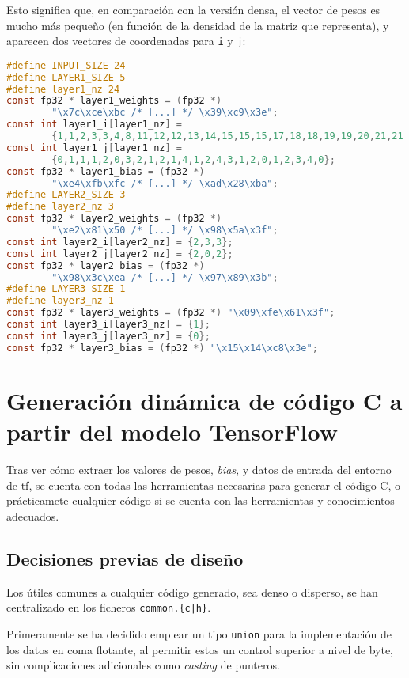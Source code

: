 Esto significa que, en comparación con la versión densa, el vector de pesos es mucho más pequeño (en función de la densidad de la matriz que representa), y aparecen dos vectores de coordenadas para \texttt{i} y \texttt{j}:\medskip
\begin{lstlisting}[language=C]
#define INPUT_SIZE 24
#define LAYER1_SIZE 5
#define layer1_nz 24
const fp32 * layer1_weights = (fp32 *)
        "\x7c\xce\xbc /* [...] */ \x39\xc9\x3e";
const int layer1_i[layer1_nz] =
        {1,1,2,3,3,4,8,11,12,12,13,14,15,15,15,17,18,18,19,19,20,21,21,23};
const int layer1_j[layer1_nz] =
        {0,1,1,1,2,0,3,2,1,2,1,4,1,2,4,3,1,2,0,1,2,3,4,0};
const fp32 * layer1_bias = (fp32 *)
        "\xe4\xfb\xfc /* [...] */ \xad\x28\xba";
#define LAYER2_SIZE 3
#define layer2_nz 3
const fp32 * layer2_weights = (fp32 *)
        "\xe2\x81\x50 /* [...] */ \x98\x5a\x3f";
const int layer2_i[layer2_nz] = {2,3,3};
const int layer2_j[layer2_nz] = {2,0,2};
const fp32 * layer2_bias = (fp32 *)
        "\x98\x3c\xea /* [...] */ \x97\x89\x3b";
#define LAYER3_SIZE 1
#define layer3_nz 1
const fp32 * layer3_weights = (fp32 *) "\x09\xfe\x61\x3f";
const int layer3_i[layer3_nz] = {1};
const int layer3_j[layer3_nz] = {0};
const fp32 * layer3_bias = (fp32 *) "\x15\x14\xc8\x3e";
\end{lstlisting}


\section{Generación dinámica de código C a partir del modelo TensorFlow}
\label{sec:generacion_din_modelo_tf}
Tras ver cómo extraer los valores de pesos, \textit{bias}, y datos de entrada del entorno de \acrlong{tf}, se cuenta con todas las herramientas necesarias para generar el código C, o prácticamete cualquier código si se cuenta con las herramientas y conocimientos adecuados.

\subsection{Decisiones previas de diseño}
\label{ssec:decisiones_previas_diseno}
Los útiles comunes a cualquier código generado, sea denso o disperso, se han centralizado en los ficheros \texttt{common.\{c|h\}}.

Primeramente se ha decidido emplear un tipo \texttt{union} para la implementación de los datos en coma flotante, al permitir estos un control superior a nivel de byte, sin complicaciones adicionales como \textit{casting} de punteros.

